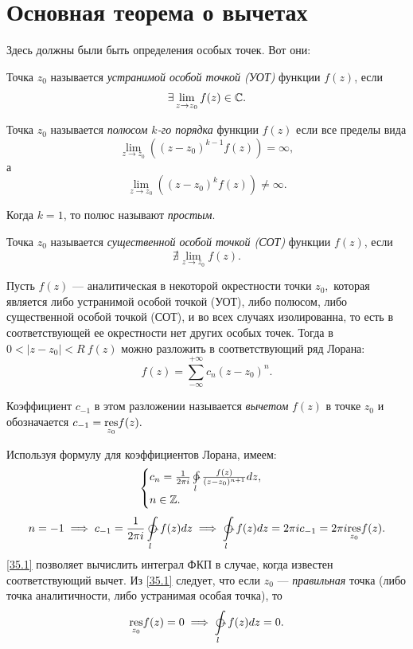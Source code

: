 \documentclass[../../main.tex]{subfiles}
\begin{document}
\section{Основная теорема о вычетах}

	\begin{erem}
	Здесь должны были быть определения особых точек. Вот они:
	
	\begin{defn}
		Точка $z_0$ называется \emph{устранимой особой точкой (УОТ)} функции $f(z)$, 
		если
		\[\exists \lim_{z\to z_0}f(z)\in \mathbb{C}.\]
	\end{defn}

	\begin{defn}
		Точка $z_0$ называется \emph{полюсом $k$-го порядка} функции $f(z)$ если все 
		пределы вида
		\[\lim_{z\to z_0}\left((z - z_0)^{k - 1} f(z)\right) = \infty,\]а
		\[\lim_{z\to z_0}\left((z - z_0)^k f(z)\right) \ne \infty.\]
		
		Когда $k = 1$, то полюс называют \emph{простым}.
	\end{defn}

	\begin{defn}
		Точка $z_0$ называется \emph{существенной особой точкой (СОТ)} функции 
		$f(z)$, если
		\[\nexists \lim_{z\to z_0}f(z).\]
	\end{defn}
	\end{erem}
	
	Пусть $f(z)$ --- аналитическая в некоторой окрестности точки $z_0,$ которая 
	является либо устранимой особой точкой (УОТ),
	либо полюсом, либо существенной особой точкой (СОТ), и во всех случаях 
	изолированна, 
	то есть в соответствующей ее окрестности нет других особых точек. Тогда в $0 
	< |z-z_0| < R \ f(z)$ можно разложить в соответствующий ряд Лорана:
	\[
		f(z) = \sum_{-\infty}^{+\infty}c_n(z-z_0)^n.
	\]
	
	Коэффициент $c_{-1}$ в этом разложении называется \emph{вычетом} $f(z)$ в 
	точке 
	$z_0$ и обозначается 
	$c_{-1} = \underset{z_0}{\operatorname{res}} f(z).$
	
	Используя формулу для коэффициентов Лорана, имеем:
	\[
		\begin{cases}
		c_n = \frac{1}{2\pi i} \ointctrclockwise\limits_{l} \frac{f(z)}{(z - 
		z_0)^{n+1}}dz,\\
		n \in \Z.
		\end{cases}
	\]
	\begin{equation} \label{35.1}
		n = -1 \implies c_{-1} = \frac{1}{2\pi i} \ointctrclockwise\limits_{l} 
		f(z)dz \implies 
		\ointctrclockwise\limits_{l} f(z)dz = 2\pi i c_{-1} = 2 \pi i 
		\underset{z_0}{\res} f(z).
	\end{equation}
	\eqref{35.1} позволяет вычислить интеграл ФКП в случае, когда известен 
	соответствующий вычет. Из \eqref{35.1} следует, что если $z_0$ --- 
	\emph{правильная} 
	точка (либо точка аналитичности, либо устранимая особая точка), то 
	\[
		\underset{z_0}{\res}f(z) = 0 \implies 
		\ointctrclockwise\limits_{l} f(z)dz = 0.
	\]
	
\end{document}
